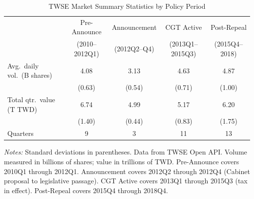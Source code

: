 \begin{table}[htbp]
\centering
\caption{TWSE Market Summary Statistics by Policy Period}
\label{tab:summary}
\begin{threeparttable}
\footnotesize
\begin{tabular}{lcccc}
\toprule
 & Pre-Announce & Announcement & CGT Active & Post-Repeal \\
 & (2010--2012Q1) & (2012Q2--Q4) & (2013Q1--2015Q3) & (2015Q4--2018) \\
\midrule
Avg.~daily vol.~(B shares) & 4.08 & 3.13 & 4.63 & 4.87 \\
 & (0.63) & (0.54) & (0.71) & (1.00) \\
Total qtr.~value (T TWD) & 6.74 & 4.99 & 5.17 & 6.20 \\
 & (1.40) & (0.44) & (0.83) & (1.75) \\
Quarters & 9 & 3 & 11 & 13 \\
\bottomrule
\end{tabular}
\begin{tablenotes}[flushleft]\footnotesize
\item \textit{Notes:} Standard deviations in parentheses. Data from TWSE Open API. Volume measured in billions of shares; value in trillions of TWD. Pre-Announce covers 2010Q1 through 2012Q1. Announcement covers 2012Q2 through 2012Q4 (Cabinet proposal to legislative passage). CGT Active covers 2013Q1 through 2015Q3 (tax in effect). Post-Repeal covers 2015Q4 through 2018Q4.
\end{tablenotes}
\end{threeparttable}
\end{table}
